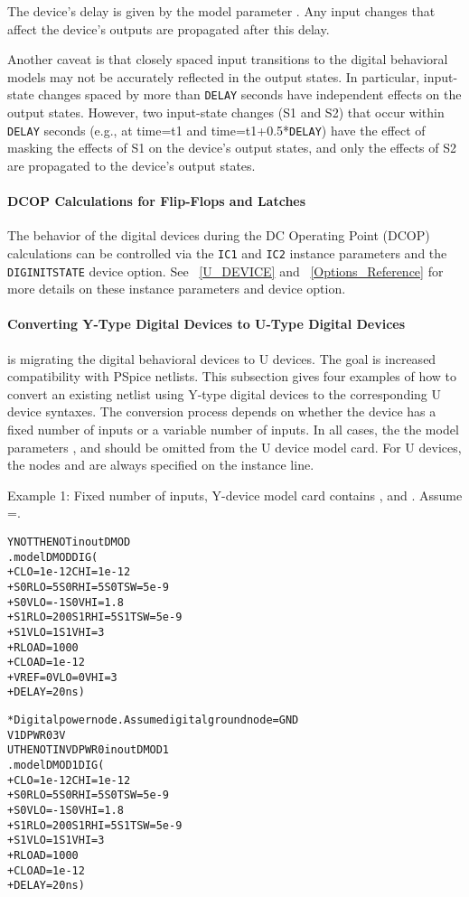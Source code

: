 The device's delay is given by the model parameter .  Any input changes
that affect the device's outputs are propagated after this delay.

Another caveat is that closely spaced input transitions to the \Xyce{} digital behavioral
models may not be accurately reflected in the output states.  In particular, input-state
changes spaced by more than \texttt{DELAY} seconds have independent effects on the output
states. However, two input-state changes (S1 and S2) that occur within \texttt{DELAY} seconds
(e.g., at time=t1 and time=t1+0.5*\texttt{DELAY}) have the effect of masking the effects
of S1 on the device's output states, and only the effects of S2 are propagated to the
device's output states.

\paragraph{DCOP Calculations for Flip-Flops and Latches}
The behavior of the digital devices during the DC Operating Point (DCOP) calculations
can be controlled via the \texttt{IC1} and \texttt{IC2} instance parameters and the
\texttt{DIGINITSTATE} device option.  See ~\ref{U_DEVICE} and ~\ref{Options_Reference} for 
more details on these instance parameters and device option.  

\paragraph{Converting Y-Type Digital Devices to U-Type Digital Devices}
\Xyce{} is migrating the digital behavioral devices to U devices.  The goal is increased
compatibility with PSpice netlists.  This subsection gives four examples of how to 
convert an existing \Xyce{} netlist using Y-type digital devices to the corresponding U device
syntaxes.  The conversion process depends on whether the device has a fixed number of inputs
or a variable number of inputs. In all cases, the the model parameters ,
 and  should be omitted from the U device model card.  For
U devices, the nodes  and  are always specified on the 
instance line.

Example 1: Fixed number of inputs, Y-device model card contains ,
 and .  Assume =.

\begin{alltt}
YNOT THENOT in out DMOD
.model DMOD DIG (
+ CLO=1e-12  CHI=1e-12
+ S0RLO=5  S0RHI=5  S0TSW=5e-9
+ S0VLO=-1  S0VHI=1.8
+ S1RLO=200  S1RHI=5  S1TSW=5e-9
+ S1VLO=1  S1VHI=3
+ RLOAD=1000
+ CLOAD=1e-12
+ VREF=0 VLO=0 VHI=3
+ DELAY=20ns )

* Digital power node.  Assume digital ground node = GND
V1 DPWR 0 3V 
UTHENOT INV DPWR 0 in out DMOD1
.model DMOD1 DIG (
+ CLO=1e-12  CHI=1e-12
+ S0RLO=5  S0RHI=5  S0TSW=5e-9
+ S0VLO=-1  S0VHI=1.8
+ S1RLO=200  S1RHI=5  S1TSW=5e-9
+ S1VLO=1  S1VHI=3
+ RLOAD=1000
+ CLOAD=1e-12
+ DELAY=20ns )
\end{alltt}


